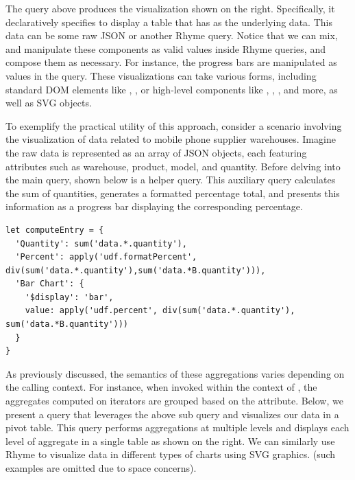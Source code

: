 \documentclass[runningheads]{llncs}
\newcommand{\lang}{Rhyme}
\begin{document}
The query above produces the visualization shown on the right.
Specifically, it declaratively specifies to display a table that
has  as the underlying data.
This data can be some raw JSON or another \lang{} query.
Notice that we can mix, and manipulate these components as valid
values inside \lang{} queries, and compose them as necessary.
For instance, the progress bars are manipulated as values in the query.
These visualizations can take various forms, including standard DOM elements
like , , or high-level components like
, , , and more,
as well as SVG objects.

To exemplify the practical utility of this approach, consider a scenario involving
the visualization of data related to mobile phone supplier warehouses.
Imagine the raw data is represented as an array of JSON objects, each featuring attributes
such as warehouse, product, model, and quantity.
Before delving into the main query, shown below is a helper query.
This auxiliary query calculates the sum of quantities, generates a formatted percentage
total, and presents this information as a progress bar displaying the corresponding percentage.

\begin{lstlisting}[style=JavaScript,columns=flexible]
let computeEntry = {
  'Quantity': sum('data.*.quantity'),
  'Percent': apply('udf.formatPercent', div(sum('data.*.quantity'),sum('data.*B.quantity'))),
  'Bar Chart': {
    '$display': 'bar',
    value: apply('udf.percent', div(sum('data.*.quantity'), sum('data.*B.quantity')))
  }
}
\end{lstlisting}

As previously discussed, the semantics of these aggregations varies depending on the
calling context.
For instance, when invoked within the context of , the
aggregates computed on \inline{*} iterators are grouped based on the  attribute.
Below, we present a query that leverages the above sub query and visualizes our data in a pivot table.
This query performs aggregations at multiple levels and displays each level of
aggregate in a single table as shown on the right.
We can similarly use \lang{} to visualize data in different types of charts using SVG graphics.
(such examples are omitted due to space concerns).
\end{document}

